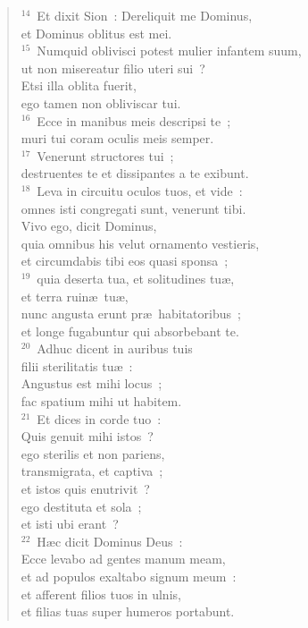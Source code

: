 \begin{flushleft}\begin{verse}${}^{14}$~Et dixit Sion~: Dereliquit me Dominus,\\ et Dominus oblitus est mei.\\
${}^{15}$~Numquid oblivisci potest mulier infantem suum,\\ ut non misereatur filio uteri sui~?\\ Etsi illa oblita fuerit,\\ ego tamen non obliviscar tui.\\
${}^{16}$~Ecce in manibus meis descripsi te~;\\ muri tui coram oculis meis semper.\\
${}^{17}$~Venerunt structores tui~;\\ destruentes te et dissipantes a te exibunt.\\
${}^{18}$~Leva in circuitu oculos tuos, et vide~:\\ omnes isti congregati sunt, venerunt tibi.\\ Vivo ego, dicit Dominus,\\ quia omnibus his velut ornamento vestieris,\\ et circumdabis tibi eos quasi sponsa~;\\
${}^{19}$~quia deserta tua, et solitudines tu\ae ,\\ et terra ruin\ae\ tu\ae ,\\ nunc angusta erunt pr\ae\ habitatoribus~;\\ et longe fugabuntur qui absorbebant te.\\
${}^{20}$~Adhuc dicent in auribus tuis\\ filii sterilitatis tu\ae~:\\ Angustus est mihi locus~;\\ fac spatium mihi ut habitem.\\
${}^{21}$~Et dices in corde tuo~:\\ Quis genuit mihi istos~?\\ ego sterilis et non pariens,\\ transmigrata, et captiva~;\\ et istos quis enutrivit~?\\ ego destituta et sola~;\\ et isti ubi erant~?\\
${}^{22}$~H\ae c dicit Dominus Deus~:\\ Ecce levabo ad gentes manum meam,\\ et ad populos exaltabo signum meum~:\\ et afferent filios tuos in ulnis,\\ et filias tuas super humeros portabunt.\\

\end{verse}
\end{flushleft}
